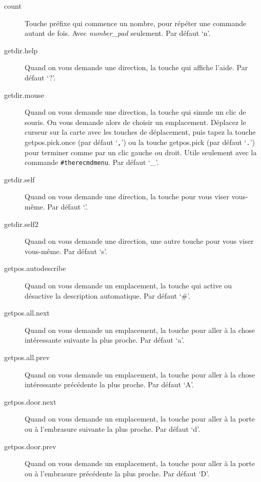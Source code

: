 \documentclass[titlepage]{article}
\begin{document}
\begin{description}
\item[{count}]
Touche préfixe qui commence un nombre, pour répéter une commande autant de
fois.
Avec
\textit{number\_pad}
seulement.
Par défaut `n'.

\item[{getdir.help}]
Quand on vous demande une direction, la touche qui affiche l'aide.
Par défaut `?'.

\item[{getdir.mouse}]
Quand on vous demande une direction, la touche qui simule un clic de
souris.
On vous demande alors de choisir un emplacement.
Déplacez le curseur sur la carte avec les touches de déplacement, puis
tapez la touche getpos.pick.once (par défaut `\texttt{,}')
ou la touche getpos.pick (par défaut `\texttt{.}')
pour terminer comme par un clic gauche ou droit.
Utile seulement avec la commande \texttt{\#therecmdmenu}.
Par défaut `\_'. 

\item[{getdir.self}]
Quand on vous demande une direction, la touche pour vous viser vous-même.
Par défaut `.'.

\item[{getdir.self2}]
Quand on vous demande une direction, une autre touche pour vous viser
vous-même.
Par défaut `s'.

\item[{getpos.autodescribe}]
Quand on vous demande un emplacement, la touche qui active ou désactive la
description automatique.
Par défaut `\#'.

\item[{getpos.all.next}]
Quand on vous demande un emplacement, la touche pour aller à la chose
intéressante suivante la plus proche.
Par défaut `a'.

\item[{getpos.all.prev}]
Quand on vous demande un emplacement, la touche pour aller à la chose
intéressante précédente la plus proche.
Par défaut `A'.

\item[{getpos.door.next}]
Quand on vous demande un emplacement, la touche pour aller à la porte ou
à l'embrasure suivante la plus proche.
Par défaut `d'.

\item[{getpos.door.prev}]
Quand on vous demande un emplacement, la touche pour aller à la porte ou
à l'embrasure précédente la plus proche.
Par défaut `D'.


\end{description}
\end{document}
